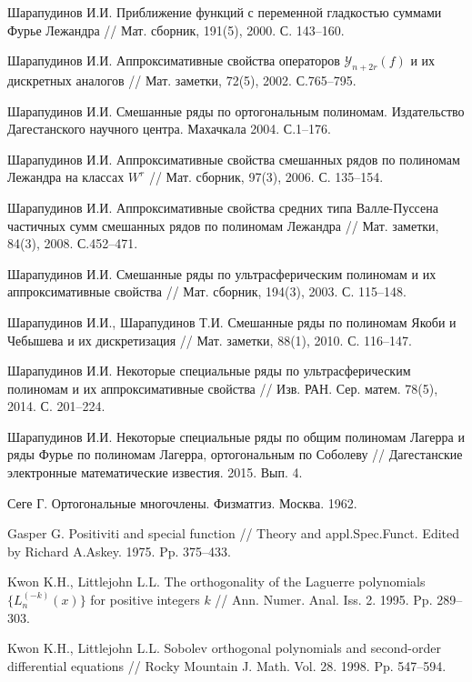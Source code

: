 \begin{thebibliography}{999}

{Шарапудинов И.И.} Приближение функций с переменной гладкостью суммами Фурье Лежандра // Мат. сборник,
191(5), 2000. С. 143--160.

{Шарапудинов И.И.} Аппроксимативные свойства операторов $\mathcal{ Y}_{n+2r}(f)$ и их дискретных аналогов // Мат. заметки, 72(5), 2002. С.765--795.

{Шарапудинов И.И.} Смешанные ряды по ортогональным полиномам. Издательство Дагестанского научного центра.
Махачкала 2004. С.1--176.

{Шарапудинов И.И.}
Аппроксимативные свойства смешанных рядов по полиномам Лежандра на классах $W^r$ //
Мат. сборник, 97(3), 2006. С. 135--154.

{Шарапудинов И.И.}
Аппроксимативные свойства средних типа Валле-Пуссена частичных сумм смешанных рядов по полиномам Лежандра // Мат. заметки, 84(3), 2008. С.452--471.

{Шарапудинов И.И.}
 Смешанные ряды по ультрасферическим полиномам и их аппроксимативные свойства
// Мат. сборник, 194(3), 2003. С. 115--148.

{Шарапудинов И.И., Шарапудинов Т.И.}
 Смешанные ряды по полиномам Якоби и Чебышева и их дискретизация
// Мат. заметки, 88(1), 2010. С. 116--147.

{Шарапудинов И.И.}
 Некоторые специальные ряды по ультрасферическим полиномам и их аппроксимативные свойства
// Изв. РАН. Сер. матем. 78(5), 2014. С. 201--224.

{Шарапудинов И.И.}
 Некоторые специальные ряды по общим полиномам Лагерра и ряды Фурье по полиномам Лагерра, ортогональным по Соболеву
// Дагестанские электронные математические известия. 2015. Вып. 4.

{Сеге Г.} Ортогональные многочлены. Физматгиз. Москва. 1962.

{Gasper G.}
 Positiviti and special function
// Theory and appl.Spec.Funct. Edited by Richard A.Askey. 1975. Pp. 375--433.

{Kwon K.H., Littlejohn L.L.}
 The orthogonality of the Laguerre polynomials $\{L_n^{(-k)}(x)\}$ for positive integers $k$
// Ann. Numer. Anal. Iss. 2. 1995. Pp. 289--303.

{Kwon K.H., Littlejohn L.L.}
 Sobolev orthogonal polynomials and second-order differential equations
// Rocky Mountain J. Math. Vol. 28. 1998. Pp. 547--594.


\end{thebibliography}
